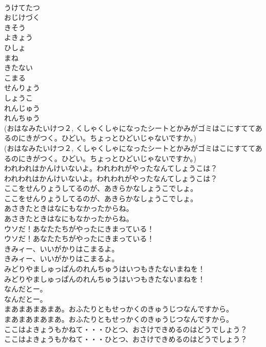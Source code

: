 \documentclass[8pt]{extreport}
\begin{document}
\begin{CJK}{UTF8}{min}
\\	うけてたつ
\\	おじけづく
\\	きそう
\\	よきょう
\\	ひしょ
\\	まね
\\	きたない
\\	こまる
\\	せんりょう
\\	しょうこ
\\	れんじゅう 
\\	れんちゅう
\\	(おはなみたいけつ２, くしゃくしゃになったシートとかみがゴミはこにすててあるのにきがつく。ひどい。ちょっとひどいじゃないですか。)	
\\	(おはなみたいけつ２, くしゃくしゃになったシートとかみがゴミはこにすててあるのにきがつく。ひどい。ちょっとひどいじゃないですか。) 
\\	われわれはかんけいないよ。われわれがやったなんてしょうこは？	
\\	われわれはかんけいないよ。われわれがやったなんてしょうこは？ 
\\	ここをせんりょうしてるのが、あきらかなしょうこでしょ。	
\\	ここをせんりょうしてるのが、あきらかなしょうこでしょ。 
\\	あさきたときはなにもなかったからね。	
\\	あさきたときはなにもなかったからね。 
\\	ウソだ！あなたたちがやったにきまっている！	
\\	ウソだ！あなたたちがやったにきまっている！ 
\\	きみィー、いいがかりはこまるよ。	
\\	きみィー、いいがかりはこまるよ。 
\\	みどりやましゅっぱんのれんちゅうはいつもきたないまねを！	
\\	みどりやましゅっぱんのれんちゅうはいつもきたないまねを！ 
\\	なんだとー。	
\\	なんだとー。 
\\	まあまあまあまあ。おふたりともせっかくのきゅうじつなんですから。	
\\	まあまあまあまあ。おふたりともせっかくのきゅうじつなんですから。 
\\	ここはよきょうもかねて・・・ひとつ、おさけできめるのはどうでしょう？	
\\	ここはよきょうもかねて・・・ひとつ、おさけできめるのはどうでしょう？ 

\end{CJK}
\end{document}

